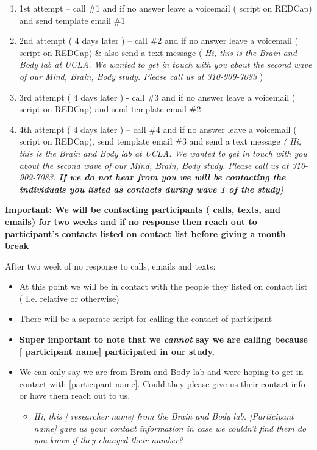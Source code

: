 \documentclass[
]{book}
\providecommand{\tightlist}{%
  \setlength{\itemsep}{0pt}\setlength{\parskip}{0pt}}
\begin{document}
\begin{enumerate}
\def\labelenumi{\arabic{enumi})}
\tightlist
\item
  1st attempt -- call \#1 and if no answer leave a voicemail ( script on REDCap) and send template email \#1
\item
  2nd attempt ( 4 days later ) -- call \#2 and if no answer leave a voicemail ( script on REDCap) \& also send a text message ( \emph{Hi, this is the Brain and Body lab at UCLA. We wanted to get in touch with you about the second wave of our Mind, Brain, Body study. Please call us at 310-909-7083} )
\item
  3rd attempt ( 4 days later ) - call \#3 and if no answer leave a voicemail ( script on REDCap) and send template email \#2
\item
  4th attempt ( 4 days later ) -- call \#4 and if no answer leave a voicemail ( script on REDCap), send template email \#3 and send a text message \emph{( Hi, this is the Brain and Body lab at UCLA. We wanted to get in touch with you about the second wave of our Mind, Brain, Body study. Please call us at 310-909-7083. \textbf{If we do not hear from you we will be contacting the individuals you listed as contacts during wave 1 of the study})}
\end{enumerate}

\textbf{Important: We will be contacting participants ( calls, texts, and emails) for two weeks and if no response then reach out to participant's contacts listed on contact list before giving a month break}

After two week of no response to calls, emails and texts:

\begin{itemize}
\item
  At this point we will be in contact with the people they listed on contact list ( I.e. relative or otherwise)
\item
  There will be a separate script for calling the contact of participant
\item
  \textbf{Super important to note that we \emph{cannot} say we are calling because {[} participant name{]} participated in our study.}
\item
  We can only say we are from Brain and Body lab and were hoping to get in contact with {[}participant name{]}. Could they please give us their contact info or have them reach out to us.

  \begin{itemize}
  \tightlist
  \item
    \emph{Hi, this {[} researcher name{]} from the Brain and Body lab. {[}Participant name{]} gave us your contact information in case we couldn't find them do you know if they changed their number?}
  \end{itemize}
\end{itemize}
\end{document}

